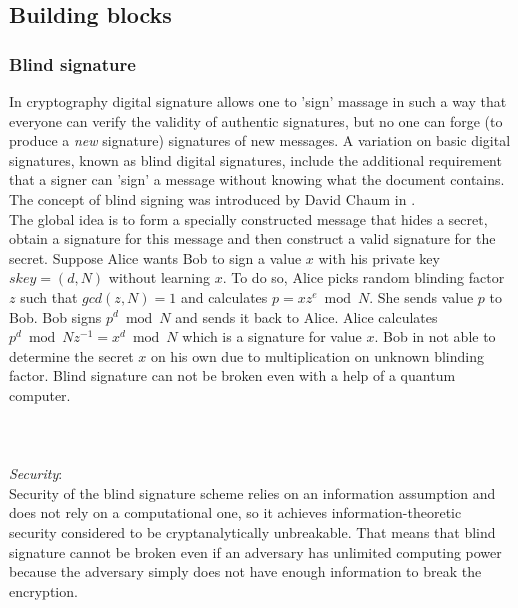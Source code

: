 \documentclass[12pt]{article}
\begin{document}
\subsection{Building blocks}
\subsubsection{Blind signature}
In cryptography digital signature allows one to 'sign' massage in such a way that everyone can verify the validity of authentic signatures, but no one can forge (to produce a \textit{new} signature) signatures of new messages. A variation on basic digital signatures, known as blind digital signatures, include the additional requirement that a signer can 'sign' a message without knowing what the document contains. The concept of blind signing was introduced by David Chaum in \cite{Chaum1982}. \\

The global idea is to form a specially constructed message that hides a secret, obtain a signature for this message and then construct a valid signature for the secret. Suppose Alice wants Bob to sign a value $x$ with his private key $skey = (d,N)$ without learning $x$. To do so, Alice picks random blinding factor $z$ such that  $gcd(z,N) = 1$ and calculates $p=xz^e\bmod N $. She sends value $p$ to Bob. Bob signs $p^d\bmod N$ and sends it back to Alice. Alice calculates $p^d\bmod N z^{-1} = x^d\bmod N$ which is a signature for value $x$. Bob in not able to determine the secret $x$ on his own due to multiplication on unknown blinding factor. Blind signature can not be broken even with a help of a quantum computer.\\\\
\\\\
 \textit{Security}:\\
 Security of the blind signature scheme relies on an information assumption and does not rely on a computational one, so it achieves information-theoretic security considered to be cryptanalytically unbreakable. That means that blind signature cannot be broken even if an adversary has unlimited computing power because the adversary simply does not have enough information to break the encryption.\\
\end{document}
